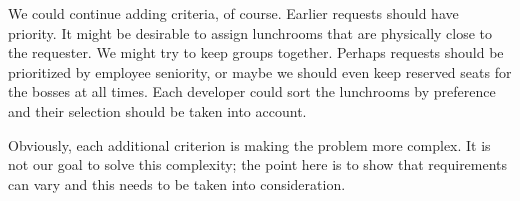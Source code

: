 \medskip

We could continue adding criteria, of course. Earlier requests should have priority. It
might be desirable to assign lunchrooms that are physically close to the requester. We
might try to keep groups together. Perhaps requests should be prioritized by employee
seniority, or maybe we should even keep reserved seats for the bosses at all times. Each
developer could sort the lunchrooms by preference and their selection should be taken
into account.

Obviously, each additional criterion is making the problem more complex. It is not our
goal to solve this complexity; the point here is to show that requirements can vary and
this needs to be taken into consideration.
